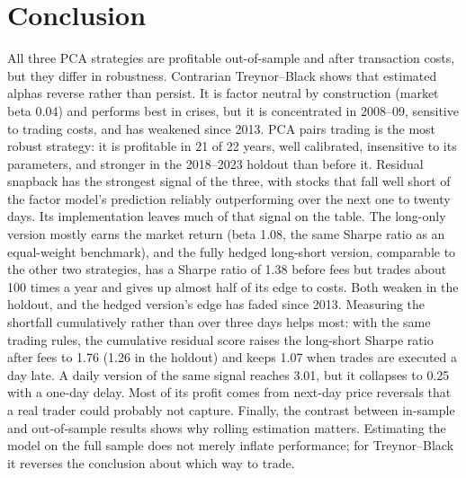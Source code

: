 \documentclass[11pt]{article}
\begin{document}
\section{Conclusion}

All three PCA strategies are profitable out-of-sample and after transaction costs, but they differ in robustness. Contrarian Treynor--Black shows that estimated alphas reverse rather than persist. It is factor neutral by construction (market beta 0.04) and performs best in crises, but it is concentrated in 2008--09, sensitive to trading costs, and has weakened since 2013. PCA pairs trading is the most robust strategy: it is profitable in 21 of 22 years, well calibrated, insensitive to its parameters, and stronger in the 2018--2023 holdout than before it. Residual snapback has the strongest signal of the three, with stocks that fall well short of the factor model's prediction reliably outperforming over the next one to twenty days. Its implementation leaves much of that signal on the table. The long-only version mostly earns the market return (beta 1.08, the same Sharpe ratio as an equal-weight benchmark), and the fully hedged long-short version, comparable to the other two strategies, has a Sharpe ratio of 1.38 before fees but trades about 100 times a year and gives up almost half of its edge to costs. Both weaken in the holdout, and the hedged version's edge has faded since 2013. Measuring the shortfall cumulatively rather than over three days helps most: with the same trading rules, the cumulative residual score raises the long-short Sharpe ratio after fees to 1.76 (1.26 in the holdout) and keeps 1.07 when trades are executed a day late. A daily version of the same signal reaches 3.01, but it collapses to 0.25 with a one-day delay. Most of its profit comes from next-day price reversals that a real trader could probably not capture. Finally, the contrast between in-sample and out-of-sample results shows why rolling estimation matters. Estimating the model on the full sample does not merely inflate performance; for Treynor--Black it reverses the conclusion about which way to trade.
\end{document}

